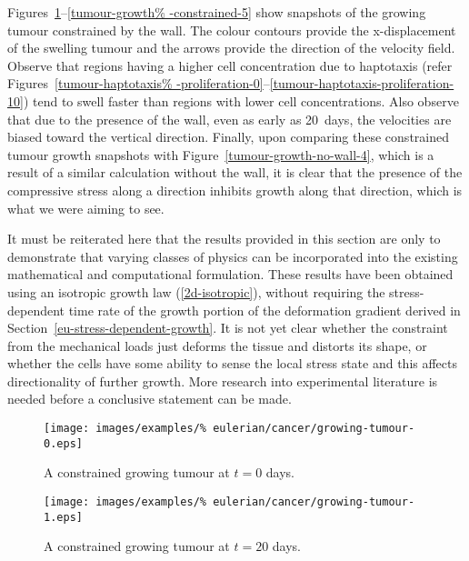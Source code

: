 Figures~\ref{tumour-growth-constrained-0}--\ref{tumour-growth%
  -constrained-5} show snapshots of the growing tumour constrained by
the wall. The colour contours provide the x-displacement of the
swelling tumour and the arrows provide the direction of the velocity
field. Observe that regions having a higher cell concentration due to
haptotaxis (refer Figures~\ref{tumour-haptotaxis%
  -proliferation-0}--\ref{tumour-haptotaxis-proliferation-10}) tend to
swell faster than regions with lower cell concentrations. Also observe
that due to the presence of the wall, even as early as 20~days, the
velocities are biased toward the vertical direction. Finally, upon
comparing these constrained tumour growth snapshots with
Figure~\ref{tumour-growth-no-wall-4}, which is a result of a similar
calculation without the wall, it is clear that the presence of the
compressive stress along a direction inhibits growth along that
direction, which is what we were aiming to see.

\vspace{1 cm} %

It must be reiterated here that the results provided in this section
are only to demonstrate that varying classes of physics can be
incorporated into the existing mathematical and computational
formulation. These results have been obtained using an isotropic
growth law (\ref{2d-isotropic}), without requiring the
stress-dependent time rate of the growth portion of the deformation
gradient derived in Section~\ref{eu-stress-dependent-growth}. It is
not yet clear whether the constraint from the mechanical loads just
deforms the tissue and distorts its shape, or whether the cells have
some ability to sense the local stress state and this affects
directionality of further growth. More research into experimental
literature is needed before a conclusive statement can be made.

\vspace{1cm} %

\begin{figure}[!hptb]
  \centering
  \texttt{[image: images/examples/\%
    eulerian/cancer/growing-tumour-0.eps]}
  \caption{A constrained growing tumour at $t=0$ days.}
  \label{tumour-growth-constrained-0}
\end{figure}

\begin{figure}[!hptb]
  \centering
  \texttt{[image: images/examples/\%
    eulerian/cancer/growing-tumour-1.eps]}
  \caption{A constrained growing tumour at $t=20$ days.}
  \label{tumour-growth-constrained-1}
\end{figure}

